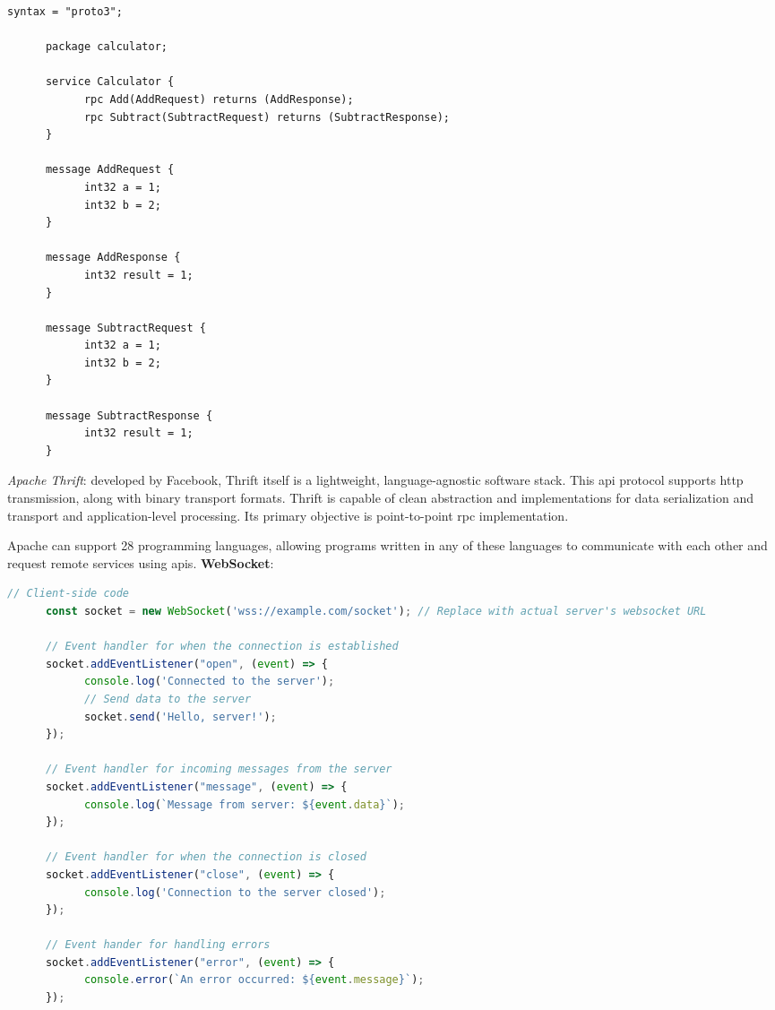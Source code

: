 \begin{lstlisting}[caption=gRPC Service For a Calculator In a Protobuf File]
      syntax = "proto3";

      package calculator;

      service Calculator {
            rpc Add(AddRequest) returns (AddResponse);
            rpc Subtract(SubtractRequest) returns (SubtractResponse);
      }

      message AddRequest {
            int32 a = 1;
            int32 b = 2;
      }

      message AddResponse {
            int32 result = 1;
      }

      message SubtractRequest {
            int32 a = 1;
            int32 b = 2;
      }

      message SubtractResponse {
            int32 result = 1;
      }
\end{lstlisting}

\begin{multicols}{2}
    \textit{Apache Thrift}: developed by Facebook, Thrift itself is a lightweight, language-agnostic software stack.
    This \acrshort{api} protocol supports \acrshort{http} transmission, along with binary transport formats. Thrift
    is capable of clean abstraction and implementations for data serialization and transport and application-level
    processing. Its primary objective is point-to-point \acrshort{rpc} implementation.

    Apache can support 28 programming languages, allowing programs written in any of these languages to communicate
    with each other and request remote services using \acrshort{api}s.
    \textbf{WebSocket}:
\end{multicols}

\begin{lstlisting}[language=JavaScript, caption=WebSocket's Example]
      // Client-side code
      const socket = new WebSocket('wss://example.com/socket'); // Replace with actual server's websocket URL
      
      // Event handler for when the connection is established
      socket.addEventListener("open", (event) => {
            console.log('Connected to the server');
            // Send data to the server
            socket.send('Hello, server!');
      });

      // Event handler for incoming messages from the server
      socket.addEventListener("message", (event) => {
            console.log(`Message from server: ${event.data}`);	
      });

      // Event handler for when the connection is closed
      socket.addEventListener("close", (event) => {
            console.log('Connection to the server closed');
      });

      // Event hander for handling errors
      socket.addEventListener("error", (event) => {
            console.error(`An error occurred: ${event.message}`);
      });
\end{lstlisting}

